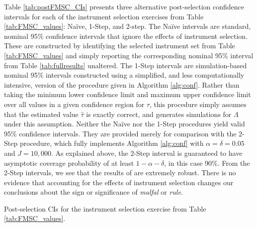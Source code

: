 Table \ref{tab:postFMSC_CIs} presents three alternative post-selection confidence intervals for each of the instrument selection exercises from Table \ref{tab:FMSC_values}: Na\"{i}ve, 1-Step, and 2-step.
The Na\"{i}ve intervals are standard, nominal 95\% confidence intervals that ignore the effects of instrument selection.
These are constructed by identifying the selected instrument set from Table \ref{tab:FMSC_values} and simply reporting the corresponding nominal 95\% interval from Table \ref{tab:fullresults} unaltered.
The 1-Step intervals are simulation-based nominal 95\% intervals constructed using a simplified, and less computationally intensive, version of the procedure given in Algorithm \ref{alg:conf}.
Rather than taking the minimum lower confidence limit and maximum upper confidence limit over all values in a given confidence region for $\tau$, this procedure simply assumes that the estimated value $\widehat{\tau}$ is exactly correct, and generates simulations for $\Lambda$ under this assumption.
Neither the Na\"{i}ve nor the 1-Step procedures yield valid 95\% confidence intervals.
They are provided merely for comparison with the 2-Step procedure, which fully implements Algorithm \ref{alg:conf} with $\alpha = \delta = 0.05$ and $J=10,000$. 
As explained above, the 2-Step interval is guaranteed to have asymptotic coverage probability of at least $1 - \alpha - \delta$, in this case 90\%.
From the 2-Step intervals, we see that the results of \cite{Carstensen2006} are extremely robust. 
There is no evidence that accounting for the effects of instrument selection changes our conclusions about the sign or significance of \emph{malfal} or \emph{rule}.

\begin{table}[htbp]
	\centering
	
	\caption{Post-selection CIs for the instrument selection exercise from Table \ref{tab:FMSC_values}.}
	\label{tab:postFMSC_CIs}
\end{table}

